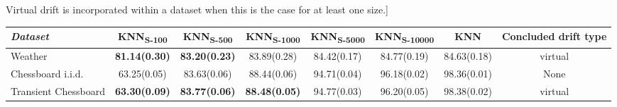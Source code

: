 \documentclass[conference]{IEEEtran}
\begin{document}
\begin{table}
Virtual drift is incorporated within a dataset when this is the case for at least one size.]{
\begin{tabular}{l|ccccccc}
\textit{Dataset} & KNN\textsubscript{S-100}&KNN\textsubscript{S-500}&KNN\textsubscript{S-1000}&KNN\textsubscript{S-5000}&KNN\textsubscript{S-10000}&KNN&Concluded drift type\\\hline
\rule{0pt}{8pt}
Weather              &\textbf{81.14(0.30)}&\textbf{83.20(0.23)}&83.89(0.28)&84.42(0.17)&84.77(0.19)&84.63(0.18)&virtual\\\hline
Chessboard i.i.d.    &63.25(0.05)&83.63(0.06)&88.44(0.06)&94.71(0.04)&96.18(0.02)&98.36(0.01)&None\\
Transient Chessboard &\textbf{63.30(0.09)}&\textbf{83.77(0.06)}&\textbf{88.48(0.05)}&94.77(0.03)&96.20(0.05)&98.38(0.02)&virtual\\
\end{tabular}
}
\end{table}
\end{document}
